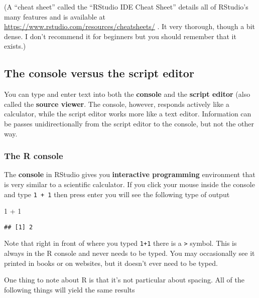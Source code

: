 \documentclass[
]{book}
\newenvironment{Shaded}{\begin{snugshade}}{\end{snugshade}}
\newcommand{\DecValTok}[1]{\textcolor[rgb]{0.00,0.00,0.81}{#1}}
\newcommand{\SpecialCharTok}[1]{\textcolor[rgb]{0.00,0.00,0.00}{#1}}
\begin{document}
(A ``cheat sheet'' called the ``RStudio IDE Cheat Sheet'' details all of RStudio's many features and is available at \url{https://www.rstudio.com/resources/cheatsheets/} . It very thorough, though a bit dense. I don't recommend it for beginners but you should remember that it exists.)

\hypertarget{the-console-versus-the-script-editor}{%
\subsection{The console versus the script editor}\label{the-console-versus-the-script-editor}}

You can type and enter text into both the \textbf{console} and the \textbf{script editor} (also called the \textbf{source viewer}. The console, however, responds actively like a calculator, while the script editor works more like a text editor. Information can be passes unidirectionally from the script editor to the console, but not the other way.

\hypertarget{the-r-console}{%
\subsubsection{The R console}\label{the-r-console}}

The \textbf{console} in RStudio gives you \textbf{interactive programming} environment that is very similar to a scientific calculator. If you click your mouse inside the console and type \texttt{1\ +\ 1} then press enter you will see the following type of output

\begin{Shaded}
\begin{Highlighting}[]
\DecValTok{1} \SpecialCharTok{+} \DecValTok{1}
\end{Highlighting}
\end{Shaded}

\begin{verbatim}
## [1] 2
\end{verbatim}

Note that right in front of where you typed \texttt{1+1} there is a \texttt{\textgreater{}} symbol. This is always in the R console and never needs to be typed. You may occasionally see it printed in books or on websites, but it doesn't ever need to be typed.

One thing to note about R is that it's not particular about spacing. All of the following things will yield the same results
\end{document}
